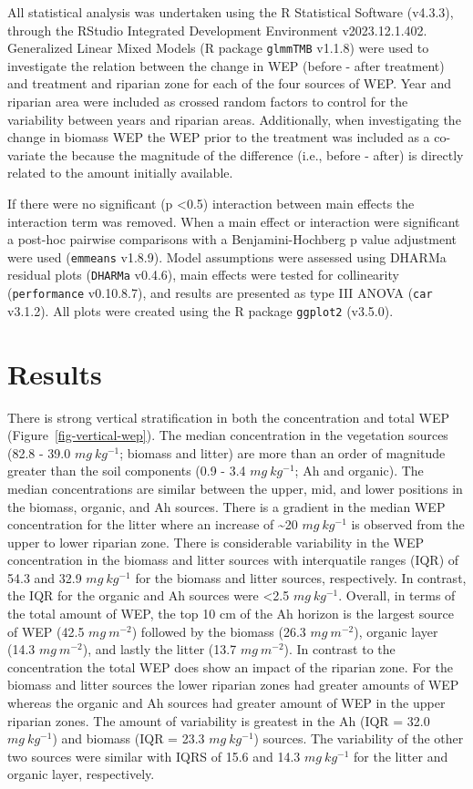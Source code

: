 \documentclass[
]{agujournal2019}
\begin{document}
All statistical analysis was undertaken using the R Statistical Software
(v4.3.3), through the RStudio Integrated Development Environment
v2023.12.1.402. Generalized Linear Mixed Models (R package
\texttt{glmmTMB} v1.1.8) were used to investigate the relation between
the change in WEP (before - after treatment) and treatment and riparian
zone for each of the four sources of WEP. Year and riparian area were
included as crossed random factors to control for the variability
between years and riparian areas. Additionally, when investigating the
change in biomass WEP the WEP prior to the treatment was included as a
co-variate the because the magnitude of the difference (i.e., before -
after) is directly related to the amount initially available.

If there were no significant (p \textless0.5) interaction between main
effects the interaction term was removed. When a main effect or
interaction were significant a post-hoc pairwise comparisons with a
Benjamini-Hochberg p value adjustment were used (\texttt{emmeans}
v1.8.9). Model assumptions were assessed using DHARMa residual plots
(\texttt{DHARMa} v0.4.6), main effects were tested for collinearity
(\texttt{performance} v0.10.8.7), and results are presented as type III
ANOVA (\texttt{car} v3.1.2). All plots were created using the R package
\texttt{ggplot2} (v3.5.0).

\section{Results}\label{results}

There is strong vertical stratification in both the concentration and
total WEP (Figure~\ref{fig-vertical-wep}). The median concentration in
the vegetation sources (82.8 - 39.0 \(mg~kg^{-1}\); biomass and litter)
are more than an order of magnitude greater than the soil components
(0.9 - 3.4 \(mg~kg^{-1}\); Ah and organic). The median concentrations
are similar between the upper, mid, and lower positions in the biomass,
organic, and Ah sources. There is a gradient in the median WEP
concentration for the litter where an increase of \textasciitilde20
\(mg~kg^{-1}\) is observed from the upper to lower riparian zone. There
is considerable variability in the WEP concentration in the biomass and
litter sources with interquatile ranges (IQR) of 54.3 and 32.9
\(mg~kg^{-1}\) for the biomass and litter sources, respectively. In
contrast, the IQR for the organic and Ah sources were \textless2.5
\(mg~kg^{-1}\). Overall, in terms of the total amount of WEP, the top 10
cm of the Ah horizon is the largest source of WEP (42.5 \(mg~m^{-2}\))
followed by the biomass (26.3 \(mg~m^{-2}\)), organic layer (14.3
\(mg~m^{-2}\)), and lastly the litter (13.7 \(mg~m^{-2}\)). In contrast
to the concentration the total WEP does show an impact of the riparian
zone. For the biomass and litter sources the lower riparian zones had
greater amounts of WEP whereas the organic and Ah sources had greater
amount of WEP in the upper riparian zones. The amount of variability is
greatest in the Ah (IQR = 32.0 \(mg~kg^{-1}\)) and biomass (IQR = 23.3
\(mg~kg^{-1}\)) sources. The variability of the other two sources were
similar with IQRS of 15.6 and 14.3 \(mg~kg^{-1}\) for the litter and
organic layer, respectively.
\end{document}
